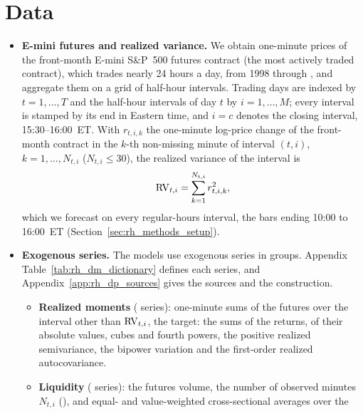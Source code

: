 \section{Data}
\label{sec:rh_data}
\begin{itemize}
\item \textbf{E-mini futures and realized variance.} We obtain one-minute prices of the front-month E-mini S\&P~500
  futures contract (the most actively traded contract), which trades nearly 24 hours a day, from 1998 through
  \rhdsSampleEnd, and aggregate them on a grid of half-hour intervals. Trading days are indexed by $t = 1, \dots, T$
  and the half-hour intervals of day $t$ by $i = 1, \dots, M$; every interval is stamped by its end in Eastern time,
  and $i = c$ denotes the closing interval, 15:30--16:00~ET. With $r_{t,i,k}$ the one-minute log-price change of the
  front-month contract in the $k$-th non-missing minute of interval $(t,i)$, $k = 1, \dots, N_{t,i}$
  ($N_{t,i} \le 30$), the realized variance of the interval is \citep{AndersenBollerslevDieboldLabys2003}
  \[
    \mathrm{RV}_{t,i} = \sum_{k=1}^{N_{t,i}} r_{t,i,k}^2 ,
  \]
  which we forecast on every regular-hours interval, the bars ending 10:00 to 16:00~ET
  (Section~\ref{sec:rh_methods_setup}).
\item \textbf{Exogenous series.} The models use \rhdmNSeriesPooled{} exogenous series in \bkNBuckets{} groups.
  Appendix Table~\ref{tab:rh_dm_dictionary} defines each series, and Appendix~\ref{app:rh_dp_sources} gives the
  sources and the construction.
  \begin{itemize}
  \item \textbf{Realized moments} (\bkSizeMom{} series): one-minute sums of the futures over the interval other than
    $\mathrm{RV}_{t,i}$, the target: the sums of the returns, of their absolute values, cubes and fourth powers, the positive
    realized semivariance, the bipower variation and the first-order realized autocovariance.
  \item \textbf{Liquidity} (\bkSizeLiq{} series): the futures volume, the number of observed minutes
    $N_{t,i}$\ifrawseries{} ()\fi, and equal- and value-weighted cross-sectional averages over the

\end{itemize}
\end{itemize}
